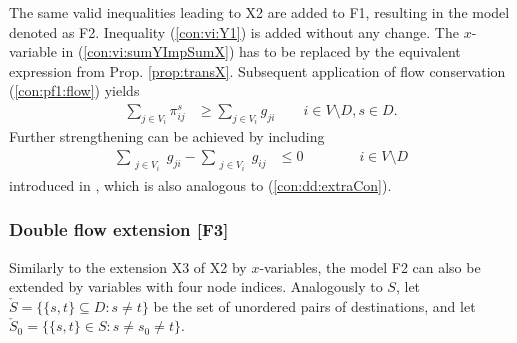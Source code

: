 The same valid inequalities  leading to X2 are added to F1, resulting in the model denoted as F2.
Inequality (\ref{con:vi:Y1}) is added without any change.
The $x$-variable in (\ref{con:vi:sumYImpSumX}) has to be replaced by the equivalent expression from Prop. \ref{prop:transX}. 
Subsequent application of flow conservation (\ref{con:pf1:flow}) yields
\begin{subequations}[resume]
\begin{flalign}
\label{con:vi:sumYImpSumXTrans} \sum\limits_{j\in V_i }\pi^{s}_{ij} & \geq \sum\limits_{j\in V_i}  g_{ji}  \quad\quad   i\in V\setminus D, s\in D. 
\end{flalign}
\end{subequations}
%
Further strengthening can be achieved by including 
\begin{subequations}[resume]
\begin{flalign}
\label{con:pf1:flowX}  \sum\limits_{\substack{ j\in V_i }}g_{ji}-\sum\limits_{\substack{j\in V_i}}g_{ij}    & \leq 0    \qquad\qquad			  i\in V\setminus D 
\end{flalign}
\end{subequations}
introduced in \cite{Polzin}, which is also analogous to (\ref{con:dd:extraCon}).

\subsubsection{Double flow extension [F3]}

Similarly to the extension X3 of X2 by $x$-variables, the model F2 can also be extended by variables with four node indices.
Analogously to $S$, let $\check{S}=\{\{s,t\}\subseteq D: s\neq t\}$ be the set of unordered pairs of destinations, and let $\check{S}_0=\{\{s,t\}\in S: s\neq s_0\neq t\}$.
 
